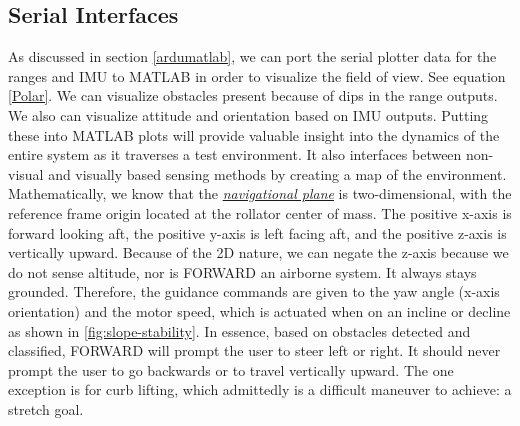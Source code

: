\subsection{Serial Interfaces}
\noindent As discussed in section \ref{ardumatlab}, we can port the serial plotter data for the ranges and IMU to MATLAB in order to visualize the field of view. See equation \ref{Polar}. We can visualize obstacles present because of dips in the range outputs. We also can visualize attitude and orientation based on IMU outputs. Putting these into MATLAB plots will provide valuable insight into the dynamics of the entire system as it traverses a test environment. It also interfaces between non-visual and visually based sensing methods by creating a map of the environment.\\

\noindent Mathematically, we know that the \underline{\textit{navigational plane}} is two-dimensional, with the reference frame origin located at the rollator center of mass. The positive x-axis is forward looking aft, the positive y-axis is left facing aft, and the positive z-axis is vertically upward. Because of the 2D nature, we can negate the z-axis because we do not sense altitude, nor is FORWARD an airborne system. It always stays grounded. Therefore, the guidance commands are given to the yaw angle (x-axis orientation) and the motor speed, which is actuated when on an incline or decline as shown in \ref{fig:slope-stability}. In essence, based on obstacles detected and classified, FORWARD will prompt the user to steer left or right. It should never prompt the user to go backwards or to travel vertically upward. The one exception is for curb lifting, which admittedly is a difficult maneuver to achieve: a stretch goal.